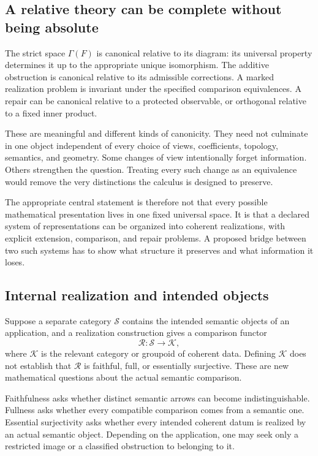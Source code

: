 \label{sec:meaning}
\subsection{A relative theory can be complete without being absolute}
The strict space \(\Gamma(F)\) is canonical relative to its diagram: its universal property determines it up to the appropriate unique isomorphism. The additive obstruction is canonical relative to its admissible corrections. A marked realization problem is invariant under the specified comparison equivalences. A repair can be canonical relative to a protected observable, or orthogonal relative to a fixed inner product.

These are meaningful and different kinds of canonicity. They need not culminate in one object independent of every choice of views, coefficients, topology, semantics, and geometry. Some changes of view intentionally forget information. Others strengthen the question. Treating every such change as an equivalence would remove the very distinctions the calculus is designed to preserve.

The appropriate central statement is therefore not that every possible mathematical presentation lives in one fixed universal space. It is that a declared system of representations can be organized into coherent realizations, with explicit extension, comparison, and repair problems. A proposed bridge between two such systems has to show what structure it preserves and what information it loses.

\subsection{Internal realization and intended objects}
Suppose a separate category \(\mathcal S\) contains the intended semantic objects of an application, and a realization construction gives a comparison functor
\[
 \mathcal R:\mathcal S\longrightarrow\mathcal K,
\]
where \(\mathcal K\) is the relevant category or groupoid of coherent data. Defining \(\mathcal K\) does not establish that \(\mathcal R\) is faithful, full, or essentially surjective. These are new mathematical questions about the actual semantic comparison.

Faithfulness asks whether distinct semantic arrows can become indistinguishable. Fullness asks whether every compatible comparison comes from a semantic one. Essential surjectivity asks whether every intended coherent datum is realized by an actual semantic object. Depending on the application, one may seek only a restricted image or a classified obstruction to belonging to it.

